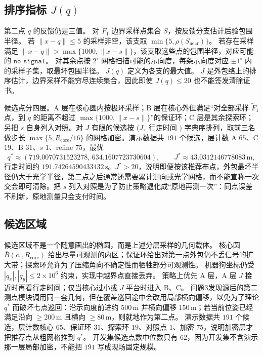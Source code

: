 \subsection{排序指标 $J(q)$}

第二点 $q$ 的反馈仍是三值。
对 $\widetilde F_1$ 边界采样点集合 $S$，按反馈分支估计后验包围半径。
若 $\|x-q\|\le 5$ 的采样非空，该支取 $\min\{5,\rho(S_{\mathrm{near}})\}$。
若存在采样满足 $\|x-q\|>\max\{1000,\|x-s\|\}$，该支取这些点的包围半径，对应可能的 $\mathtt{no\_signal}$。
对其余点按 $2^\circ$ 网格扫描可能的示向度，每条示向度对应 $\pm 1^\circ$ 内的采样子集，取最坏包围半径。
$J(q)$ 定义为各支的最大值。
$J$ 是外包络上的排序估计，边界采样不能穷尽连续集合，因此即使 $J(q)\le 20$ 也不能签发清除证书。

候选点分四层。A 层在核心圆内按极环采样；B 层在核心外但满足“对全部采样 $\widetilde F_1$ 点，到 $q$ 的距离不超过 $\max\{1000,\|x-s\|\}$”的保证环；C 层是其余探索环；另把 $s$ 自身列入对照。对 $J$ 有限的候选按 $(J,$ 行走时间 $)$ 字典序排列，取前三名做步长 $\max\{5,R_{\mathrm{core}}/16\}$ 的网格加密。演示数据共 $191$ 个候选，层计数 A $65$、C $19$、B $31$、$s$ $1$、refine $75$，最优
\begin{equation}
q^\ast\approx(719.0070731523278,\,634.1607723730604),\qquad J^\ast\approx 43.0312146778083\,\mathrm{m},
\end{equation}
行走时间约 $191.74264590433432\,\mathrm{s}$。$J^\ast>20$，说明即便按该推荐布点，外包最坏半径仍大于光学半径，第二点之后通常还需要累计测向或光学网格，而不能宣称一次交会即可清除。把 $s$ 列入对照是为了防止策略退化成“原地再测一次”：同点误差不刷新，原地测量只会支付时间。

\subsection{候选区域}

候选区域不是一个随意画出的椭圆，而是上述分层采样的几何载体。
核心圆 $\overline B(c_1,R_{\mathrm{core}})$ 给出尽量可观测的内区；保证环给出对第一点外包仍不丢信号的扩大带；探索环允许为了压缩角向不确定性而牺牲部分可观测性。
机器狗坐标仍受 $|q_x|,|q_y|\le 2\times 10^6$ 约束，实现中越界点直接丢弃。
策略上优先 A 层，A 层 $J$ 接近时再看行走时间；仅当核心过小或 $J$ 平台时进入 B、C。
问题3发现源后的第二测点模块调用同一套几何，但在覆盖巡回途中会改用局部横向偏移，以免为了理论 $q^\ast$ 而破坏七点巡回：沿示向度前进约 $500\,\mathrm{m}$ 并横向偏移 $150\,\mathrm{m}$；若当前位姿已经满足沿向 $\ge 200\,\mathrm{m}$ 且横向 $\ge 80\,\mathrm{m}$，则就地作为第二点。
演示数据共 $191$ 个候选，层计数核心 $65$、保证环 $31$、探索环 $19$、对照点 $1$、加密 $75$，说明加密层才把推荐点从粗网格推到 $q^\ast$。
开发集候选点数中位数只有 $62$，因为开发集不含演示那一层局部加密，不能把 $191$ 写成现场固定规模。

